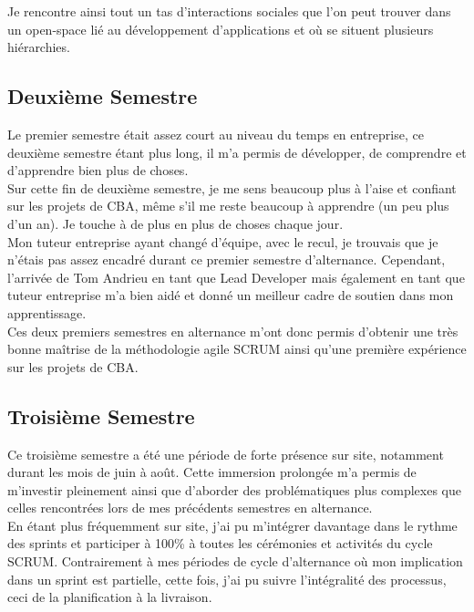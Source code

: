 \documentclass{article}
\begin{document}
Je rencontre ainsi tout un tas d'interactions sociales que l'on peut trouver dans un open-space lié au développement d'applications et où se situent plusieurs hiérarchies.

\subsection{ Deuxième Semestre}

Le premier semestre était assez court au niveau du temps en entreprise, ce deuxième semestre étant plus long, il m'a permis de développer, de comprendre et d'apprendre bien plus de choses. \\

Sur cette fin de deuxième semestre, je me sens beaucoup plus à l'aise et confiant sur les projets de CBA, même s'il me reste beaucoup à apprendre (un peu plus d'un an). Je touche à de plus en plus de choses chaque jour. \\

Mon tuteur entreprise ayant changé d'équipe, avec le recul, je trouvais que je n'étais pas assez encadré durant ce premier semestre d'alternance. Cependant, l'arrivée de Tom Andrieu en tant que Lead Developer mais également en tant que tuteur entreprise m'a bien aidé et donné un meilleur cadre de soutien dans mon apprentissage. \\

Ces deux premiers semestres en alternance m'ont donc permis d'obtenir une très bonne maîtrise de la méthodologie agile SCRUM ainsi qu'une première expérience sur les projets de CBA.

\newpage

\subsection{ Troisième Semestre}

Ce troisième semestre a été une période de forte présence sur site, notamment durant les mois de juin à août. Cette immersion prolongée m'a permis de m'investir pleinement ainsi que d'aborder des problématiques plus complexes que celles rencontrées lors de mes précédents semestres en alternance. \\

En étant plus fréquemment sur site, j'ai pu m'intégrer davantage dans le rythme des sprints et participer à 100\% à toutes les cérémonies et activités du cycle SCRUM. Contrairement à mes périodes de cycle d'alternance où mon implication dans un sprint est partielle, cette fois, j'ai pu suivre l'intégralité des processus, ceci de la planification à la livraison. \\
\end{document}
